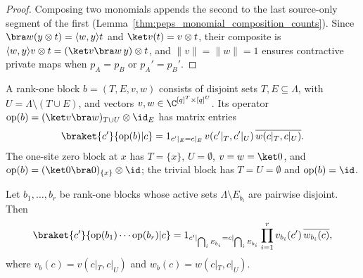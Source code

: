 \begin{proof}\leanok
    Composing two monomials appends the second to the last
    source-only segment of the first (Lemma~\ref{thm:peps_monomial_composition_counts}). Since $\bra w(y\otimes t)=\langle w,y\rangle t$ and $\ket v(t)=v\otimes t$, their composite is $\langle w,y\rangle v\otimes t=(\ket v\bra w\,y)\otimes t$, and $\lVert v\rVert=\lVert w\rVert=1$ ensures contractive private maps when $p_A=p_B$ or $p_A'=p_B'$.
\end{proof}

\begin{definition}
    \label{def:peps_rank_one_block}
    \leanok
    A rank-one block $b=(T,E,v,w)$ consists of disjoint sets $T,E\subseteq\Lambda$, with
    $U=\Lambda\setminus(T\cup E)$, and vectors $v,w\in\C^{[q]^T\times[q]^U}$. Its operator $\mathrm{op}(b)=(\ket v\bra w)_{T\cup U}\otimes\id_E$ has matrix entries
    \begin{align}
        \braket{c'}{\mathrm{op}(b)|c}=1_{c'|_E=c|_E}\,v(c'|_T,c'|_U)\,\overline{w(c|_T,c|_U)}.
        \label{eq:peps_rank_one_block_entry}
    \end{align}
    The one-site zero block at $x$ has $T=\{x\}$, $U=\emptyset$, $v=w=\ket0$, and $\mathrm{op}(b)=(\ket0\bra0)_{\{x\}}\otimes\id$; the trivial block has $T=U=\emptyset$ and $\mathrm{op}(b)=\id$.
\end{definition}

\begin{lemma}
    \label{lem:peps_rank_one_block_products}
    \leanok
    Let $b_1,\dots,b_r$ be rank-one blocks whose active sets $\Lambda\setminus E_{b_i}$ are pairwise disjoint. Then
    \begin{align}
        \braket{c'}{\mathrm{op}(b_1)\cdots\mathrm{op}(b_r)|c}
        =1_{c'|_{\bigcap_i E_{b_i}}=c|_{\bigcap_i E_{b_i}}}\prod_{i=1}^r v_{b_i}(c')\,\overline{w_{b_i}(c)},
        \label{eq:peps_rank_one_block_prod}
    \end{align}
    where $v_b(c)=v(c|_T,c|_U)$ and $w_b(c)=w(c|_T,c|_U)$.
\end{lemma}

